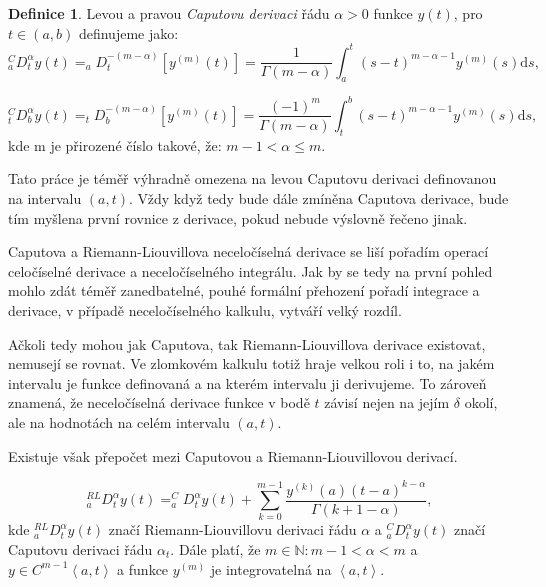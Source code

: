 \documentclass[a4paper,12pt,twoside]{article}
\theoremstyle{definition}
\newtheorem{defin}[veta]{Definice}
\theoremstyle{remark}
\numberwithin{equation}{section}
\numberwithin{table}{section}
\numberwithin{figure}{section}
\newcommand{\dx}[1]{\mathrm{d} #1}
\newcommand{\N}{\mathbb{N}}
\begin{document}
\begin{defin}%
	Levou a pravou \emph{Caputovu derivaci} řádu $\alpha > 0$ funkce $y\left(t\right)$, pro $t \in \left(a,b\right) $ definujeme jako:
\begin{equation} \label{CaputoDerivace} ^{C}_{a}D_{t}^{\alpha} y\left(t\right) = _{a}D_{t}^{- \left(m-\alpha\right) }\left[y^{\left(m\right)} \left(t\right)\right] = \frac{1}{\Gamma\left(m-\alpha\right)} \int_{a}^{t} \left(s-t\right)^{m-\alpha-1}y^{\left(m\right)} \left(s\right) \dx s,\end{equation}

$$^{C}_{t}D_{b}^{\alpha} y\left(t\right) = _{t}D_{b}^{- \left(m-\alpha\right) }\left[y^{\left(m\right)} \left(t\right)\right] = \frac{\left(-1\right)^m}{\Gamma\left(m-\alpha\right)} \int_{t}^{b} \left(s-t\right)^{m-\alpha-1}y^{\left(m\right)} \left(s\right) \dx s,$$
kde m je přirozené číslo takové, že: $m-1<\alpha\leq m$.
\end{defin}

Tato práce je téměř výhradně omezena na levou Caputovu derivaci definovanou na intervalu $\left(a, t\right)$. Vždy když tedy bude dále zmíněna Caputova derivace, bude tím myšlena první rovnice z derivace, pokud nebude výslovně řečeno jinak.

Caputova a Riemann-Liouvillova neceločíselná derivace se liší pořadím operací celočíselné derivace a neceločíselného integrálu. Jak by se tedy na první pohled mohlo zdát téměř zanedbatelné, pouhé formální přehození pořadí integrace a derivace, v případě neceločíselného kalkulu, vytváří velký rozdíl.

Ačkoli tedy mohou jak Caputova, tak Riemann-Liouvillova derivace existovat, nemusejí se rovnat.
Ve zlomkovém kalkulu totiž hraje velkou roli i to, na jakém intervalu je funkce definovaná a na kterém intervalu ji derivujeme. To zároveň znamená, že neceločíselná derivace funkce v bodě $t$ závisí nejen na jejím $\delta$ okolí, ale na hodnotách na celém intervalu $\left(a, t\right)$.

Existuje však přepočet mezi Caputovou a Riemann-Liouvillovou derivací.

\begin{equation}\label{PrepocetRL->C1}
	_{a}^{RL}D^{\alpha}_{t} y\left(t\right) =  _{a}^{C}D^{\alpha}_{t} y\left(t\right) + \sum_{k=0}^{m-1} \frac{y^{\left(k\right)}\left(a\right)\left(t-a\right)^{k-\alpha}}{\Gamma\left(k+1-\alpha\right)},
\end{equation}
kde $_{a}^{RL}D^{\alpha}_{t} y\left(t\right)$ značí Riemann-Liouvillovu derivaci řádu $\alpha$ a $_{a}^{C}D^{\alpha}_{t} y\left(t\right)$ značí Caputovu derivaci řádu $\alpha_{t}$. Dále platí, že $m \in \N: m-1<\alpha<m$ a $y\in C^{m-1}\left<a, t\right>$ a funkce $y^{\left(m\right)}$ je integrovatelná na $\left< a, t \right>$.
\end{document}
